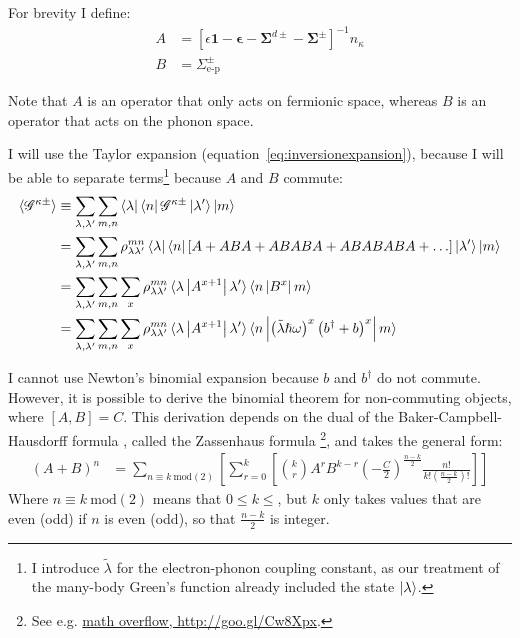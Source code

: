 For brevity I define:
\begin{align*}
A &=\left[ \epsilon \mathbf{1} - \mathbf{\epsilon} - \mathbf{\Sigma}^{d\pm} - \mathbf{\Sigma}^\pm \right]^{-1} n_\kappa \\
B &= \Sigma^\pm_\text{e-p}
\end{align*}

Note that $A$ is an operator that only acts on fermionic space, whereas $B$ is an operator that acts on the phonon space. 

I will use the Taylor expansion (equation~\ref{eq:inversionexpansion}), because I will be able to separate terms\footnote{I introduce $\tilde{\lambda}$ for the electron-phonon coupling constant, as our treatment of the many-body Green's function already included the state $\ket{\lambda}$.} because $A$ and $B$ commute:
\begin{align*}
\braket{\mathscr{G}^{\kappa\pm}} &\equiv \sum_{\lambda, \lambda^\prime} \sum_{m,n} \bra{\lambda}\bra{n} \mathscr{G}^{\kappa\pm} \ket{\lambda^\prime}\ket{m} \\
&= \sum_{\lambda, \lambda^\prime} \sum_{m,n}\rho_{\lambda\lambda^\prime}^{mn} \bra{\lambda}\bra{n}\left[A + ABA + ABABA + ABABABA + \ldots\right] \ket{\lambda^\prime}\ket{m} \\
&= \sum_{\lambda, \lambda^\prime} \sum_{m,n} \sum_x\rho_{\lambda\lambda^\prime}^{mn} \braket{\lambda \left| A^{x+1} \right| \lambda^\prime} \braket{n\left| B^x \right|m} \\
&= \sum_{\lambda, \lambda^\prime} \sum_{m,n} \sum_x\rho_{\lambda\lambda^\prime}^{mn} \braket{\lambda \left| A^{x+1} \right| \lambda^\prime} \braket{n\left| \left(\tilde{\lambda}\hslash\omega\right)^x\left(b^\dagger+b\right)^x \right|m} \\ 
\end{align*}

I cannot use Newton's binomial expansion because $b$ and $b^\dagger$ do not commute. However, it is possible to derive the binomial theorem for non-commuting objects, where $\left[A,B\right] = C$. This derivation depends on the dual of the Baker-Campbell-Hausdorff formula \cite{kaspermothpoulsen}, called the Zassenhaus formula \footnote{See e.g. \href{http://goo.gl/Cw8Xpx}{math overflow, http://goo.gl/Cw8Xpx}.}, and takes the general form:
\begin{align*}
(A+B)^n &= \sum_{n\equiv k\:\text{mod}(2)}\left[ \sum^k_{r=0}\left[ \binom{k}{r}A^r B^{k-r} \left(-\frac{C}{2}\right)^\frac{n-k}{2} \frac{n!}{k! \left(\frac{n-k}{2}\right)!}\right]\right] 
\end{align*}
Where $n\equiv k\:\text{mod}(2)$ means that $0\leq k\leq$, but $k$ only takes values that are even (odd) if $n$ is even (odd), so that $\frac{n-k}{2}$ is integer.

